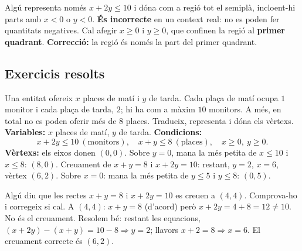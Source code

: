 \begin{exemple}
Algú representa només $x+2y\le 10$ i dóna com a regió tot el semiplà, incloent-hi
parts amb $x<0$ o $y<0$. \textbf{És incorrecte} en un context real: no es poden fer
quantitats negatives. Cal afegir $x\ge 0$ i $y\ge 0$, que confinen la regió al
\textbf{primer quadrant}. \textbf{Correcció:} la regió és només la part del primer
quadrant.
\end{exemple}

\subsection{Exercicis resolts}

\begin{exresolt}
Una entitat ofereix $x$ places de matí i $y$ de tarda. Cada plaça de matí ocupa $1$
monitor i cada plaça de tarda, $2$; hi ha com a màxim $10$ monitors. A més, en total
no es poden oferir més de $8$ places. Tradueix, representa i dóna els vèrtexs.
\solucio
\textbf{Variables:} $x$ places de matí, $y$ de tarda. \textbf{Condicions:}
\[
x+2y\le 10 \ (\text{monitors}),\quad x+y\le 8 \ (\text{places}),\quad x\ge 0,\ y\ge 0.
\]
\textbf{Vèrtexs:} els eixos donen $(0,0)$. Sobre $y=0$, mana la més petita de
$x\le 10$ i $x\le 8$: $(8,0)$. Creuament de $x+y=8$ i $x+2y=10$: restant, $y=2$,
$x=6$, vèrtex $(6,2)$. Sobre $x=0$: mana la més petita de $y\le 5$ i $y\le 8$:
$(0,5)$.

\begin{center}
\end{center}
\end{exresolt}

\begin{exresolt}
Algú diu que les rectes $x+y=8$ i $x+2y=10$ es creuen a $(4,4)$. Comprova-ho i
corregeix si cal.
\solucio
A $(4,4)$: $x+y=8$ (d'acord) però $x+2y=4+8=12\neq 10$. No és el creuament. Resolem
bé: restant les equacions, $(x+2y)-(x+y)=10-8\Rightarrow y=2$; llavors $x+2=8\Rightarrow
x=6$. El creuament correcte és $(6,2)$.
\end{exresolt}

